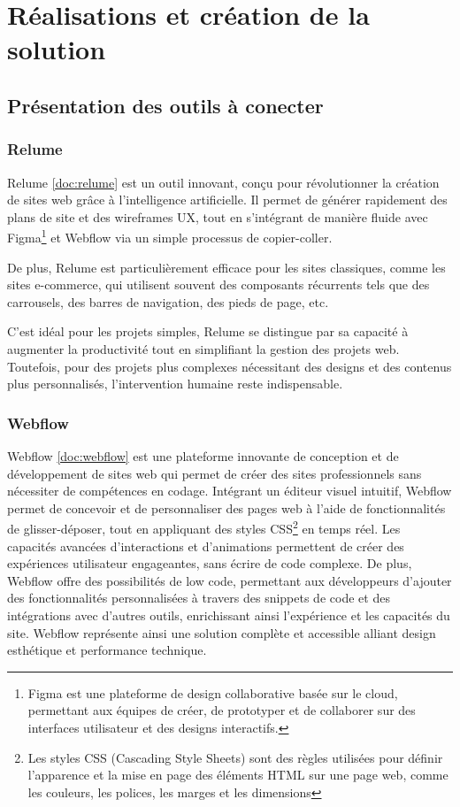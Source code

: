 \chapter{Réalisations et création de la solution}
\section{Présentation des outils à conecter}

\subsection{Relume}

Relume \ref{doc:relume} est un outil innovant, conçu pour révolutionner la création de sites web grâce à l'intelligence artificielle. Il permet de générer rapidement des plans de site et des wireframes UX, tout en s'intégrant de manière fluide avec Figma\footnote{Figma est une plateforme de design collaborative basée sur le cloud, permettant aux équipes de créer, de prototyper et de collaborer sur des interfaces utilisateur et des designs interactifs.} et Webflow via un simple processus de copier-coller. 

De plus, Relume est particulièrement efficace pour les sites classiques, comme les sites e-commerce, qui utilisent souvent des composants récurrents tels que des carrousels, des barres de navigation, des pieds de page, etc.

C'est idéal pour les projets simples, Relume se distingue par sa capacité à augmenter la productivité tout en simplifiant la gestion des projets web. Toutefois, pour des projets plus complexes nécessitant des designs et des contenus plus personnalisés, l’intervention humaine reste indispensable. 

\subsection{Webflow}
Webflow \ref{doc:webflow} est une plateforme innovante de conception et de développement de sites web qui permet de créer des sites professionnels sans nécessiter de compétences en codage. Intégrant un éditeur visuel intuitif, Webflow permet de concevoir et de personnaliser des pages web à l'aide de fonctionnalités de glisser-déposer, tout en appliquant des styles CSS\footnote{Les styles CSS (Cascading Style Sheets) sont des règles utilisées pour définir l'apparence et la mise en page des éléments HTML sur une page web, comme les couleurs, les polices, les marges et les dimensions} en temps réel. Les capacités avancées d'interactions et d'animations permettent de créer des expériences utilisateur engageantes, sans écrire de code complexe. De plus, Webflow offre des possibilités de low code, permettant aux développeurs d'ajouter des fonctionnalités personnalisées à travers des snippets de code et des intégrations avec d'autres outils, enrichissant ainsi l'expérience et les capacités du site. Webflow représente ainsi une solution complète et accessible alliant design esthétique et performance technique.

